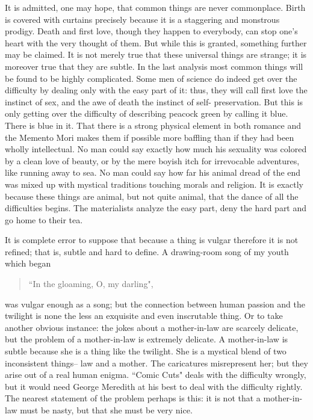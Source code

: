 \documentclass[final,10pt,letterpaper,twocolumn,openany]{book}
\begin{document}
     It is admitted, one may hope, that common things are never
commonplace. Birth is covered with curtains precisely because it is a
staggering and monstrous prodigy. Death and first love, though they
happen to everybody, can stop one's heart with the very thought of them.
But while this is granted, something further may be claimed. It is not
merely true that these universal things are strange; it is moreover true that
they are subtle. In the last analysis most common things will be found to
be highly complicated. Some men of science do indeed get over the
difficulty by dealing only with the easy part of it: thus, they will call first
love the instinct of sex, and the awe of death the instinct of self-
preservation. But this is only getting over the difficulty of describing
peacock green by calling it blue. There is blue in it. That there is a strong
physical element in both romance and the Memento Mori makes them if
possible more baffling than if they had been wholly intellectual. No man
could say exactly how much his sexuality was colored by a clean love of
beauty, or by the mere boyish itch for irrevocable adventures, like running
away to sea. No man could say how far his animal dread of the end was
mixed up with mystical traditions touching morals and religion. It is
exactly because these things are animal, but not quite animal, that the
dance of all the difficulties begins. The materialists analyze the easy part,
deny the hard part and go home to their tea.

It is complete error to suppose that because a thing is vulgar therefore
it is not refined; that is, subtle and hard to define. A drawing-room song of
my youth which began 
\begin{quotation}\noindent
	``In the gloaming, O, my darling",
\end{quotation}
 was vulgar
enough as a song; but the connection between human passion and the
twilight is none the less an exquisite and even inscrutable thing. Or to take
another obvious instance: the jokes about a mother-in-law are scarcely
delicate, but the problem of a mother-in-law is extremely delicate. A
mother-in-law is subtle because she is a thing like the twilight. She is a
mystical blend of two inconsistent things-- law and a mother. The
caricatures misrepresent her; but they arise out of a real human enigma.
``Comic Cuts" deals with the difficulty wrongly, but it would need George
Meredith at his best to deal with the difficulty rightly. The nearest
statement of the problem perhaps is this: it is not that a mother-in-law
must be nasty, but that she must be very nice.
\end{document}
